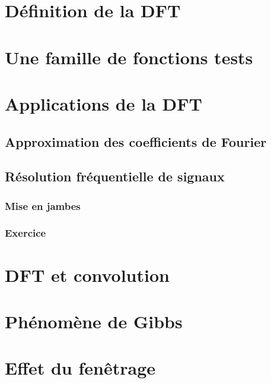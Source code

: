 \documentclass[a4paper,12pt]{report}
\begin{document}
\newpage
\null
\newpage
\tableofcontents


\chapter{Définition de la DFT}
	
\chapter{Une famille de fonctions tests}

\chapter{Applications de la DFT}

	\section{Approximation des coefficients de Fourier}

	\section{R\'esolution fr\'equentielle de signaux}

		\subsection{Mise en jambes}

		\subsection{Exercice}

\chapter{DFT et convolution}

\chapter{Ph\'enom\`ene de Gibbs}

\chapter{Effet du fen\^etrage}

\listoffigures
\end{document}
